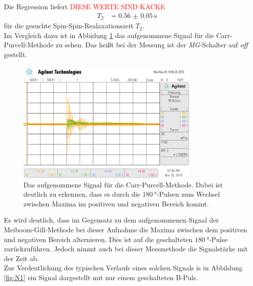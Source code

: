 Die Regression liefert
\textcolor{red}{DIESE WERTE SIND KACKE}
\begin{align}
  T_2 &=  \SI{0.56(005)}{\second}
\end{align}
für die gesuchte Spin-Spin-Realaxationszeit $T_2$. \\
Im Vergleich dazu ist in Abbidung \ref{fig:t2_off} das aufgenommene Signal für die Carr-Purcell-Methode zu sehen. Das heißt bei der 
Messung ist der \textit{MG}-Schalter auf \textit{off} gestellt.
\begin{figure}[H]
  \centering
  \includegraphics[width=0.8\textwidth]{../data/scope_76.png}
  \caption{Das aufgenommene Signal für die Carr-Purcell-Methode. Dabei ist deutlich zu erkennen, dass es durch die 
  $\SI{180}{\degree}$-Pulsen zum Wechsel zwischen Maxima im positiven und negativen Bereich kommt.}
  \label{fig:t2_off}
\end{figure} \noindent
Es wird deutlich, dass im Gegensatz zu dem aufgenommenen Signal der Meiboom-Gill-Methode bei dieser Aufnahme die Maxima zwischen
dem positiven und negativen Bereich alternieren. Dies ist auf die geschalteten $\SI{180}{\degree}$-Pulse zurückzuführen. Jedoch
nimmt auch bei dieser Messmethode die Signalstärke mit der Zeit ab. \\
Zur Verdeutlichung des typischen Verlaufs eines solchen Signals is in Abbildung \ref{fig:N1} ein Signal dargestellt mit nur einem
geschalteten B-Puls.
